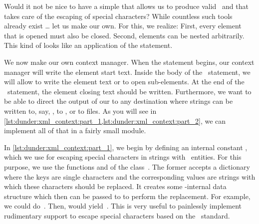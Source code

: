 %
%
%
%
%

Would it not be nice to have a simple  that allows us to produce valid~ and that takes care of the escaping of special characters?
While countless such tools already exist {\dots} let us make our own.
For this, we realize:
First, every  element that is opened must also be closed.
Second,  elements can be nested arbitrarily.
This kind of looks like an application of the  statement.

We now make our own context manager.
When the  statement begins, our context manager will write the element start text.
Inside the body of the ~statement, we will allow to write the element text or to open sub-elements.
At the end of the ~statement, the  element closing text should be written.
Furthermore, we want to be able to direct the output of our  to any destination where strings can be written to, say, , to , or to files.
As you will see in \cref{lst:dunder:xml_context:part_1,lst:dunder:xml_context:part_2}, we can implement all of that in a fairly small module.

In \cref{lst:dunder:xml_context:part_1}, we begin by defining an internal constant , which we use for  escaping special characters in strings with ~entities.
For this purpose, we use the functions  and  of the class~.
The former accepts a dictionary where the keys are single characters and the corresponding values are strings with which these characters should be replaced.
It creates some \python-internal data structure which then can be passed to  to perform the replacement.
For example, we could do~.
Then,  would yield~.
This is very useful to painlessly implement rudimentary support to escape special characters based on the ~standard.

